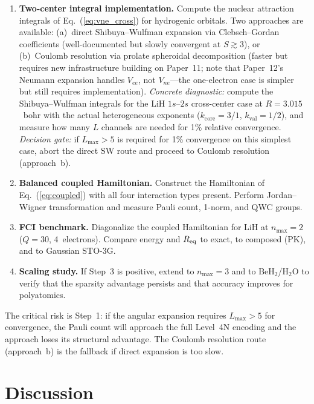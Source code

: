 \documentclass[aps,pra,twocolumn,superscriptaddress,longbibliography]{revtex4-2}
\begin{document}
\begin{enumerate}
\item \textbf{Two-center integral implementation.}  Compute the
  nuclear attraction integrals of Eq.~(\ref{eq:vne_cross}) for
  hydrogenic orbitals.  Two approaches are available:
  (a)~direct Shibuya--Wulfman expansion via Clebsch--Gordan
  coefficients (well-documented but slowly convergent at $S \gtrsim 3$),
  or (b)~Coulomb resolution via prolate spheroidal decomposition
  (faster but requires new infrastructure building on Paper~11;
  note that Paper~12's Neumann expansion handles $V_{ee}$, not
  $V_{ne}$---the one-electron case is simpler but still requires
  implementation).
  \emph{Concrete diagnostic:} compute the Shibuya--Wulfman integrals
  for the LiH $1s$--$2s$ cross-center case at $R = 3.015$~bohr with
  the actual heterogeneous exponents ($k_{\mathrm{core}} = 3/1$,
  $k_{\mathrm{val}} = 1/2$), and measure how many $L$ channels are
  needed for 1\% relative convergence.
  \emph{Decision gate:} if $L_{\max} > 5$ is required for 1\%
  convergence on this simplest case, abort the direct SW route and
  proceed to Coulomb resolution (approach~b).

\item \textbf{Balanced coupled Hamiltonian.}  Construct the
  Hamiltonian of Eq.~(\ref{eq:coupled}) with all four interaction
  types present.  Perform Jordan--Wigner transformation and measure
  Pauli count, 1-norm, and QWC groups.

\item \textbf{FCI benchmark.}  Diagonalize the coupled Hamiltonian
  for LiH at $n_{\max} = 2$ ($Q = 30$, 4~electrons).  Compare energy
  and $R_{\rm eq}$ to exact, to composed (PK), and to Gaussian
  STO-3G.

\item \textbf{Scaling study.}  If Step~3 is positive, extend to
  $n_{\max} = 3$ and to BeH$_2$/H$_2$O to verify that the sparsity
  advantage persists and that accuracy improves for polyatomics.
\end{enumerate}

The critical risk is Step~1: if the angular expansion requires
$L_{\max} > 5$ for convergence, the Pauli count will approach the
full Level~4N encoding and the approach loses its structural advantage.
The Coulomb resolution route (approach~b) is the fallback if direct
expansion is too slow.


\section{Discussion}
\label{sec:discussion}
\end{document}
